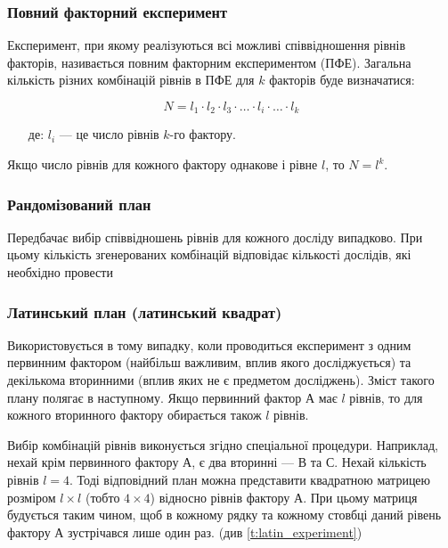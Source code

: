 \subsubsection{Повний факторний експеримент}

Експеримент, при якому реалізуються всі можливі співвідношення рівнів факторів, називається повним
факторним експериментом (ПФЕ). Загальна кількість різних комбінацій рівнів в ПФЕ для $k$ факторів буде
визначатися:

\begin{equation}
  \label{eq:pfe}
  N = l_1 \cdot l_2 \cdot l_3 \cdot \ldots \cdot l_i \cdot \ldots \cdot l_k
\end{equation}
\begin{itemize}[labelsep=*]
\item [де:] $l_i$ --- це число рівнів $k$-го фактору.
\end{itemize}

Якщо число рівнів для кожного фактору однакове і рівне $l$, то $N=l^k$.

\subsubsection{ Рандомізований план}

Передбачає вибір співвідношень рівнів для кожного досліду випадково. При цьому кількість
згенерованих комбінацій відповідає кількості дослідів, які необхідно провести

\subsubsection{Латинський план (латинський квадрат)}

Використовується в тому випадку, коли проводиться експеримент з одним первинним фактором (найбільш
важливим, вплив якого досліджується) та декількома вторинними (вплив яких не є предметом
досліджень). Зміст такого плану полягає в наступному. Якщо первинний фактор А має $l$ рівнів, то для
кожного вторинного фактору обирається також $l$ рівнів.

Вибір комбінацій рівнів виконується згідно спеціальної процедури. Наприклад, нехай крім первинного
фактору $А$, є два вторинні --- $В$ та $С$. Нехай кількість рівнів $l=4$. Тоді відповідний план
можна представити квадратною матрицею розміром $l \times l$ (тобто $4 \times 4$) відносно рівнів
фактору $А$.  При цьому матриця будується таким чином, щоб в кожному рядку та кожному стовбці даний
рівень фактору $А$ зустрічався лише один раз. (див \ref{t:latin_experiment})

